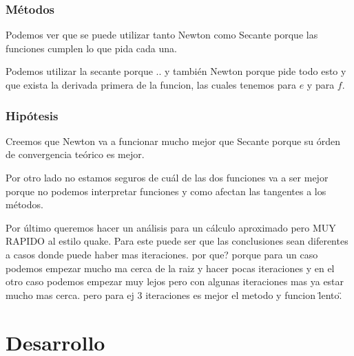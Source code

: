 \documentclass[10pt,a4paper]{article}
\begin{document}
\subsubsection{Métodos}
Podemos ver que se puede utilizar tanto Newton como Secante porque las
funciones cumplen lo que pida cada una.

Podemos utilizar la secante porque .. y también Newton porque pide todo esto y
que exista la derivada primera de la funcion, las cuales tenemos para $e$ y para
$f$.

\subsubsection{Hipótesis}
Creemos que Newton va a funcionar mucho mejor que Secante porque su órden de
convergencia teórico es mejor.

Por otro lado no estamos seguros de cuál de las dos funciones va a ser mejor
porque no podemos interpretar funciones y como afectan las tangentes a los
métodos.

Por último queremos hacer un análisis para un cálculo aproximado pero MUY
RAPIDO al estilo quake. Para este puede ser que las conclusiones sean
diferentes a casos donde puede haber mas iteraciones.  por que? porque para un
caso podemos empezar mucho ma cerca de la raiz y hacer pocas iteraciones y en
el otro caso podemos empezar muy lejos pero con algunas iteraciones mas ya
estar mucho mas cerca. pero para ej 3 iteraciones es mejor el metodo y funcion
\"lento\".



\newpage \section{Desarrollo}
\end{document}
